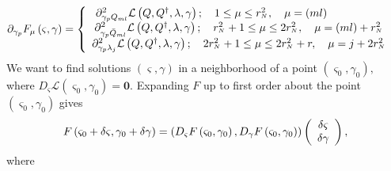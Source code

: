 \documentclass[aps,preprint]{revtex4}%
\begin{document}
\begin{align}
\partial_{\gamma_{p}}F_{\mu}\left(  \varsigma,\gamma\right)   &  =\left\{
\begin{array}
[c]{c}%
\partial_{\gamma_{p}Q_{ml}}^{2}\mathcal{L}\left(  Q,Q^{\dagger},\lambda
,\gamma\right)  ;\quad1\leq\mu\leq r_{^{N}}^{2},\quad\mu=\left(  ml\right)
\qquad\qquad\quad\\
\partial_{\gamma_{p}\bar{Q}_{ml}}^{2}\mathcal{L}\left(  Q,Q^{\dagger}%
,\lambda,\gamma\right)  ;\quad r_{^{N}}^{2}+1\leq\mu\leq2r_{^{N}}^{2},\quad
\mu=\left(  ml\right)  +r_{^{N}}^{2}\\
\partial_{\gamma_{p}\lambda_{j}}^{2}\mathcal{L}\left(  Q,Q^{\dagger}%
,\lambda,\gamma\right)  ;\quad2r_{^{N}}^{2}+1\leq\mu\leq2r_{^{N}}^{2}%
+r,\quad\mu=j+2r_{^{N}}^{2}%
\end{array}
\right.
\end{align}
We want to find solutions $\left(  \varsigma,\gamma\right)  $ in a
neighborhood of a point $\left(  \varsigma_{0},\gamma_{0}\right)  ,$ where
$D_{\varsigma}\mathcal{L}\left(  \varsigma_{0},\gamma_{0}\right)
=\mathbf{0}.$ Expanding $F$ up to first order about the point $\left(
\varsigma_{0},\gamma_{0}\right)  $ gives
\begin{equation}
F\left(  \varsigma_{0}+\delta\varsigma,\gamma_{0}+\delta\gamma\right)
=\left(  D_{\varsigma}F\left(  \varsigma_{0},\gamma_{0}\right)  ,D_{\gamma
}F\left(  \varsigma_{0},\gamma_{0}\right)  \right)  \left(
\begin{array}
[c]{c}%
\delta\varsigma\\
\delta\gamma
\end{array}
\right)  ,
\end{equation}
where
\end{document}
